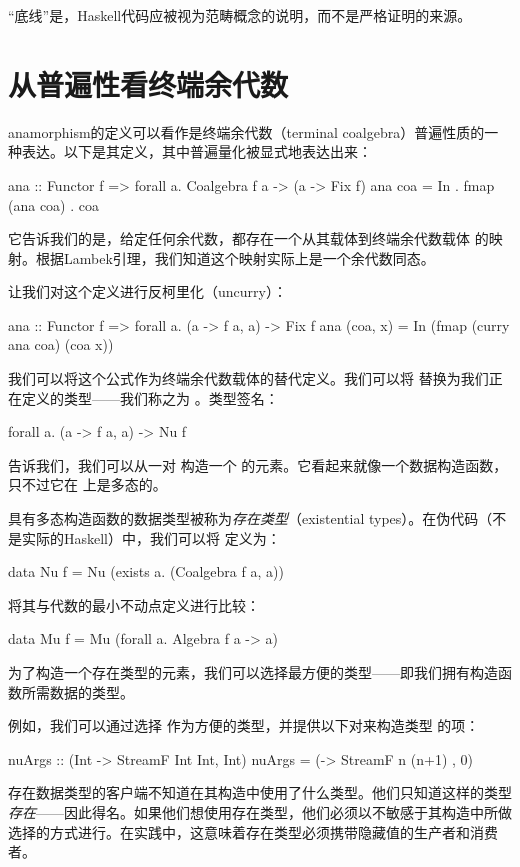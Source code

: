 \documentclass[DaoFP]{subfiles}
\begin{document}
“底线”是，Haskell代码应被视为范畴概念的说明，而不是严格证明的来源。

\section{从普遍性看终端余代数}

anamorphism的定义可以看作是终端余代数（terminal coalgebra）普遍性质的一种表达。以下是其定义，其中普遍量化被显式地表达出来：
\begin{haskell}
ana :: Functor f => forall a. Coalgebra f a -> (a -> Fix f)
ana coa = In . fmap (ana coa) . coa 
\end{haskell}
它告诉我们的是，给定任何余代数，都存在一个从其载体到终端余代数载体  的映射。根据Lambek引理，我们知道这个映射实际上是一个余代数同态。

让我们对这个定义进行反柯里化（uncurry）：
\begin{haskell}
ana :: Functor f => forall a. (a -> f a, a) -> Fix f
ana (coa, x) = In (fmap (curry ana coa) (coa x))
\end{haskell}
我们可以将这个公式作为终端余代数载体的替代定义。我们可以将  替换为我们正在定义的类型——我们称之为 。类型签名：
\begin{haskell}
forall a. (a -> f a, a) -> Nu f
\end{haskell}
告诉我们，我们可以从一对  构造一个  的元素。它看起来就像一个数据构造函数，只不过它在  上是多态的。

具有多态构造函数的数据类型被称为\emph{存在类型}（existential types）。在伪代码（不是实际的Haskell）中，我们可以将  定义为：
\begin{haskell}
data Nu f = Nu (exists a. (Coalgebra f a, a))
\end{haskell}
将其与代数的最小不动点定义进行比较：
\begin{haskell}
data Mu f = Mu (forall a. Algebra f a -> a)
\end{haskell}

为了构造一个存在类型的元素，我们可以选择最方便的类型——即我们拥有构造函数所需数据的类型。

例如，我们可以通过选择  作为方便的类型，并提供以下对来构造类型  的项：
\begin{haskell}
nuArgs :: (Int -> StreamF Int Int, Int)
nuArgs =  (\n -> StreamF n (n+1) , 0)
\end{haskell}

存在数据类型的客户端不知道在其构造中使用了什么类型。他们只知道这样的类型\emph{存在}——因此得名。如果他们想使用存在类型，他们必须以不敏感于其构造中所做选择的方式进行。在实践中，这意味着存在类型必须携带隐藏值的生产者和消费者。
\end{document}
